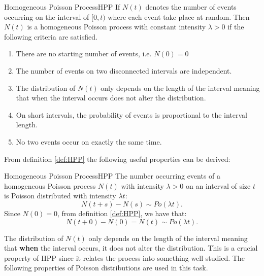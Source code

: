 \begin{definition}{Homogeneous Poisson Process}{HPP}
    If $N(t)$ denotes the number of events occurring on the interval of $[0,t)$ where each event take place at random. Then $N(t)$ is a homogeneous Poisson process with constant intensity $\lambda>0$ if the following criteria are satisfied.
    \begin{enumerate}
        \item There are no starting number of events, i.e. $N(0)=0$
        \item The number of events on two disconnected intervals are independent.
        \item The distribution of $N(t)$ only depends on the length of the interval meaning that when the interval occurs does not alter the distribution.
        \item On short intervals, the probability of events is proportional to the interval length.
        \item No two events occur on exactly the same time.
    \end{enumerate}
\end{definition}
From definition \ref{def:HPP} the following useful properties can be derived:
\begin{properties}{Homogeneous Poisson Process}{HPP}
The number occurring events of a homogeneous Poisson process $N(t)$ with intensity $\lambda>0$ on an interval of size $t$ is Poisson distributed with intensity $\lambda t$:
\begin{equation}
    N(t+s)-N(s)\sim \textit{Po}(\lambda t) .
\label{eq:HPPincDist}
\end{equation}
Since $N(0)=0$, from definition \ref{def:HPP}, we have that:
\begin{equation}
    N(t+0)-N(0)=N(t)\sim \textit{Po}(\lambda t) .
\end{equation}
\end{properties}
\noindent

The distribution of $N(t)$ only depends on the length of the interval meaning that \textbf{when} the interval occurs, it does not alter the distribution. This is a crucial property of HPP since it relates the process into something well studied. The following properties of Poisson distributions are used in this task.

